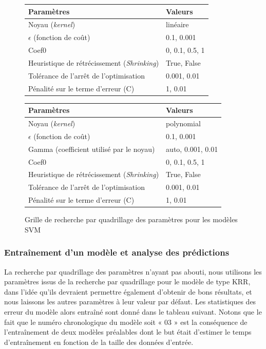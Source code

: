 \begin{figure}[!h]
	\centering
	
	\begin{tabular}{|l|l|}
		\hline
		\textbf{Paramètres} & \textbf{Valeurs} \\ \hline 
		Noyau (\emph{kernel}) & linéaire\\ \hline
		$\epsilon$ (fonction de coût) & 0.1, 0.001 \\ \hline
		Coef0 & 0, 0.1, 0.5, 1 \\ \hline
		Heuristique de rétrécissement (\emph{Shrinking}) & True, False \\ \hline
		Tolérance de l'arrêt de l'optimisation & 0.001, 0.01 \\ \hline
		Pénalité sur le terme d'erreur (C) & 1, 0.01\\ \hline
	\end{tabular}
	
	\vspace{0.5cm}	

	\begin{tabular}{|l|l|}
		\hline
		\textbf{Paramètres} & \textbf{Valeurs} \\ \hline 
		Noyau (\emph{kernel}) & polynomial\\ \hline
		$\epsilon$ (fonction de coût) & 0.1, 0.001 \\ \hline
		Gamma (coefficient utilisé par le noyau) & auto, 0.001, 0.01 \\ \hline
		Coef0 & 0, 0.1, 0.5, 1 \\ \hline
		Heuristique de rétrécissement (\emph{Shrinking}) & True, False \\ \hline
		Tolérance de l'arrêt de l'optimisation & 0.001, 0.01 \\ \hline
		Pénalité sur le terme d'erreur (C) & 1, 0.01\\ \hline
	\end{tabular}		
	
	\caption{Grille de recherche par quadrillage des paramètres pour les modèles SVM}
\end{figure}

\subsubsection{Entraînement d'un modèle et analyse des prédictions}
\par La recherche par quadrillage des paramètres n'ayant pas abouti, nous utilisons les paramètres issus de la recherche par quadrillage pour le modèle de type KRR, dans l'idée qu'ils devraient permettre également d'obtenir de bons résultats, et nous laissons les autres paramètres à leur valeur par défaut. Les statistiques des erreur du modèle alors entraîné sont donné dans le tableau suivant. Notons que le fait que le numéro chronologique du modèle soit « 03 » est la conséquence de l'entraînement de deux modèles préalables dont le but était d'estimer le temps d'entraînement en fonction de la taille des données d'entrée.\\

